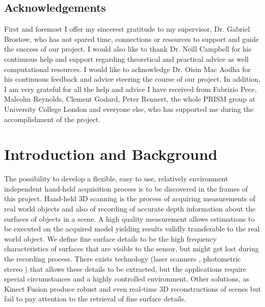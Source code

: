 \documentclass{ucl_thesis}
\begin{document}
\newpage
\section*{Acknowledgements}
First and foremost I offer my sincerest gratitude to my supervisor, Dr. Gabriel Brostow, who has not spared time, connections or resources to support and guide the success of our project. I would also like to thank Dr. Neill Campbell for his continuous help and support regarding theoretical and practical advice as well computational resources. I would like to acknowledge Dr. Oisin Mac Aodha for his continuous feedback and advice steering the course of our project. In addition, I am very grateful for all the help and advice I have received from Fabrizio Pece, Malcolm Reynolds, Clement Godard, Peter Rennert, the whole PRISM group at University College London and everyone else, who has supported me during the accomplishment of the project.

\tableofcontents
\listoffigures
\newpage

\setcounter{page}{1}
\pagestyle{plain}

\chapter{Introduction and Background} 

The possibility to develop a flexible, easy to use, relatively environment independent hand-held acquisition process is to be discovered in the frames of this project. Hand-held 3D scanning is the process of acquiring measurements of real world objects and also of recording of accurate depth information about the surfaces of objects in a scene. A high quality measurement allows estimations to be executed on the acquired model yielding results validly transferable to the real world object. We define fine surface details to be the high frequency characteristics of surfaces that are visible to the sensor, but might get lost during the recording process. There exists technology (laser scanners \cite{DiebelThrun05} \cite{Schuon09}, photometric stereo \cite{Nehab05}) that allows these details to be extracted, but the applications require special circumstances and a highly controlled environment. Other solutions, as Kinect Fusion \cite{Izadi11} produce robust and even real-time 3D reconstructions of scenes but fail to pay attention to the retrieval of fine surface details. \\
\end{document}
